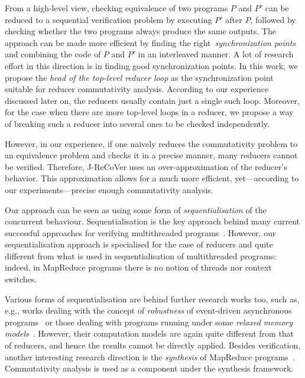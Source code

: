 \documentclass{llncs}
\begin{document}
From a high-level view, checking equivalence of two programs $P$ and $P'$ can be
reduced to a sequential verification problem by executing $P'$ after $P$,
followed by checking whether the two programs always produce the same outputs.
The approach can be made more efficient by finding the
right~\emph{synchronization points} and combining the code of $P$ and $P'$ in an
interleaved manner. A lot of research effort in this direction is in finding
good synchronization points. In this work, we propose the \emph{head of the
top-level reducer loop} as the synchronization point suitable for reducer
commutativity analysis. According to our experience discussed later on, the
reducers usually contain just a single such loop. Moreover, for the case when
there are more top-level loops in a reducer, we propose a way of breaking such a
reducer into several ones to be checked independently.

However, in our experience, if one naively reduces the commutativity problem to
an equivalence problem and checks it in a precise manner, many reducers cannot
be verified. Therefore, J-ReCoVer uses an over-approximation of the reducer's
behavior. This approximation allows for a much more efficient, yet---according
to our experiments---precise enough commutativity analysis.

Our approach can be seen as using some form of \emph{sequentialisation} of the
concurrent behaviour. Sequentialisation is the key approach behind many current
successful approaches for verifying multithreaded
programs~\cite{LalReps:Seq:08,LazyCSeq14}. However, our sequentialisation
approach is specialised for the case of reducers and quite different from what
is used in sequentialisation of multithreaded programs: indeed, in MapReduce
programs there is no notion of threads nor context switches.

Various forms of sequentialisation are behind further research works too, such
as, e.g., works dealing with the concept of \emph{robustness} of event-driven
asynchronous programs~\cite{ahmed2017:robustness} or those dealing with programs
running under some \emph{relaxed memory
models}~\cite{ahmed2013:robustness,AbdullaACLR13,AbdullaACLR12}. However, their
computation models are again quite different from that of reducers, and hence
the results cannot be directly applied.
Besides verification, another interesting research direction is the
\emph{synthesis} of MapReduce programs~\cite{SmithA16}. Commutativity analysis
is used as a component under the synthesis framework.
\end{document}
